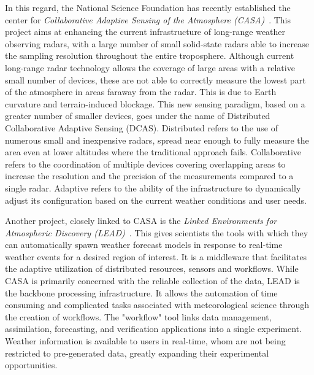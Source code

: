 In this regard, the National Science Foundation has recently established the center for
\textit{Collaborative Adaptive Sensing of the Atmosphere (CASA)}~\cite{casa}. This project aims at
enhancing the current infrastructure of long-range weather observing radars, with a large number of small
solid-state radars able to increase the sampling resolution throughout the entire troposphere. Although
current \mbox{long-range} radar technology allows the coverage of large areas with a relative small
number of devices, these are not able to correctly measure the lowest part of the atmosphere in areas
faraway from the radar. This is due to Earth curvature and terrain-induced blockage.  This new sensing
paradigm, based on a greater number of smaller devices, goes under the name of Distributed Collaborative
Adaptive Sensing (DCAS). Distributed refers to the use of numerous small and inexpensive radars, spread
near enough to fully measure the area even at lower altitudes where the traditional approach fails.
Collaborative refers to the coordination of multiple devices covering overlapping areas to increase the
resolution and the precision of the measurements compared to a single radar. Adaptive refers to the
ability of the infrastructure to dynamically adjust its configuration based on the current weather
conditions and user needs.

Another project, closely linked to CASA is the \emph{Linked Environments for Atmospheric Discovery
(LEAD)}~\cite{lead}. This gives scientists the tools with which they can automatically spawn weather
forecast models in response to real-time weather events for a desired region of interest. It is a
middleware that facilitates the adaptive utilization of distributed resources, sensors and workflows.
While CASA is primarily concerned with the reliable collection of the data, LEAD is the backbone
processing infrastructure. It allows the automation of time consuming and complicated tasks associated
with meteorological science through the creation of workflows. The "workflow" tool links data management,
assimilation, forecasting, and verification applications into a single experiment. Weather information is
available to users in real-time, whom are not being restricted to pre-generated data, greatly expanding
their experimental opportunities.


